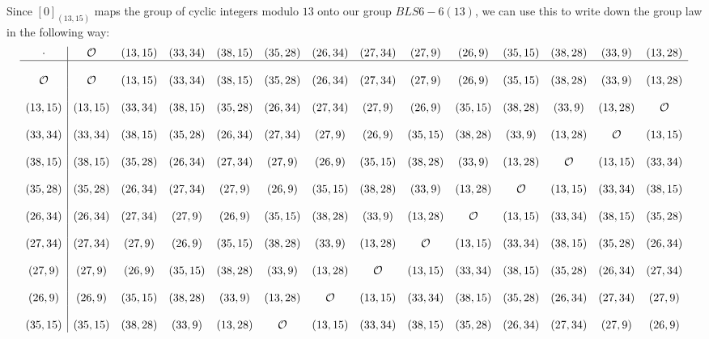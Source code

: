 Since $[0]_{(13,15)}$ maps the group of cyclic integers modulo $13$ onto our group $BLS6-6(13)$, we can use this to write down the group law in the following way:
\begingroup
    \fontsize{5pt}{5pt}\selectfont
$$
\begin{array}{c|ccccccccccccc}
\cdot & \mathcal{O}  & (13,15) & (33,34) & (38,15) & (35,28) & (26,34) & (27,34) & (27,9) & (26,9) & (35,15) & (38,28) & (33,9) & (13,28)\\
\hline
\\
\mathcal{O} & \mathcal{O}  & (13,15) & (33,34) & (38,15) & (35,28) & (26,34) & (27,34) & (27,9) & (26,9) & (35,15) & (38,28) & (33,9) & (13,28)\\
\\
(13,15) & (13,15) & (33,34) & (38,15) & (35,28) & (26,34) & (27,34) & (27,9) & (26,9) & (35,15) & (38,28) & (33,9) & (13,28) & \mathcal{O}\\
\\
(33,34) & (33,34) & (38,15) & (35,28) & (26,34) & (27,34) & (27,9) & (26,9) & (35,15) & (38,28) & (33,9) & (13,28) & \mathcal{O} & (13,15)\\
\\
(38,15) & (38,15) & (35,28) & (26,34) & (27,34) & (27,9) & (26,9) & (35,15) & (38,28) & (33,9) & (13,28) & \mathcal{O} & (13,15) & (33,34)\\
\\
(35,28) & (35,28) & (26,34) & (27,34) & (27,9) & (26,9) & (35,15) & (38,28) & (33,9) & (13,28) & \mathcal{O} & (13,15) & (33,34) & (38,15)\\
\\
(26,34) & (26,34) & (27,34) & (27,9) & (26,9) & (35,15) & (38,28) & (33,9) & (13,28) & \mathcal{O} & (13,15) & (33,34) & (38,15) & (35,28)\\
\\
(27,34) & (27,34) & (27,9) & (26,9) & (35,15) & (38,28) & (33,9) & (13,28) & \mathcal{O} & (13,15) & (33,34) & (38,15) & (35,28) & (26,34)\\
\\
(27,9) & (27,9) & (26,9) & (35,15) & (38,28) & (33,9) & (13,28) & \mathcal{O} & (13,15) & (33,34) & (38,15) & (35,28) & (26,34) & (27,34)\\
\\
(26,9) & (26,9) & (35,15) & (38,28) & (33,9) & (13,28) & \mathcal{O} & (13,15) & (33,34) & (38,15) & (35,28) & (26,34) & (27,34) & (27,9)\\
\\
(35,15) & (35,15) & (38,28) & (33,9) & (13,28) & \mathcal{O} & (13,15) & (33,34) & (38,15) & (35,28) & (26,34) & (27,34) & (27,9) & (26,9)\\

\end{array}$$
